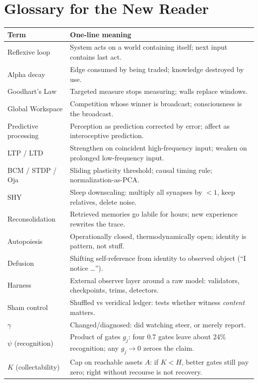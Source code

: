 \documentclass[11pt]{article}
\begin{document}
\section{Glossary for the New Reader}
\label{app:glossary}

\begin{center}
\small
\begin{tabular}{p{2.8cm}p{8.8cm}}
\toprule
Term & One-line meaning \\
\midrule
Reflexive loop & System acts on a world containing itself; next input contains last act. \\
Alpha decay & Edge consumed by being traded; knowledge destroyed by use. \\
Goodhart's Law & Targeted measure stops measuring; walls replace windows. \\
Global Workspace & Competition whose winner is broadcast; consciousness is the broadcast. \\
Predictive processing & Perception as prediction corrected by error; affect as interoceptive prediction. \\
LTP / LTD & Strengthen on coincident high-frequency input; weaken on prolonged low-frequency input. \\
BCM / STDP / Oja & Sliding plasticity threshold; causal timing rule; normalization-as-PCA. \\
SHY & Sleep downscaling: multiply all synapses by $<1$, keep relatives, delete noise. \\
Reconsolidation & Retrieved memories go labile for hours; new experience rewrites the trace. \\
Autopoiesis & Operationally closed, thermodynamically open; identity is pattern, not stuff. \\
Defusion & Shifting self-reference from identity to observed object (``I notice \dots''). \\
Harness & External observer layer around a raw model: validators, checkpoints, trims, detectors. \\
Sham control & Shuffled vs veridical ledger: tests whether witness \emph{content} matters. \\
$\gamma$ & Changed/diagnosed: did watching steer, or merely report. \\
$\psi$ (recognition) & Product of gates $g_j$: four 0.7 gates leave about 24\% recognition; any $g_j\to0$ zeroes the claim. \\
$K$ (collectability) & Cap on reachable assets $A$: if $K<H$, better gates still pay zero; right without recourse is not recovery. \\

\end{tabular}
\end{center}
\end{document}

